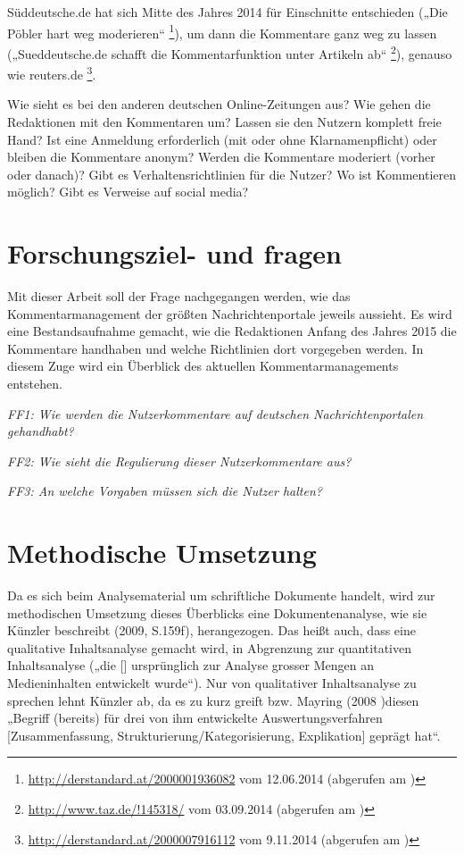 \documentclass[12pt]{article} %
\begin{document}
Süddeutsche.de hat sich Mitte des Jahres 2014 für Einschnitte entschieden („Die Pöbler hart weg moderieren“ 
\footnote{\url{http://derstandard.at/2000001936082} vom 12.06.2014 (abgerufen am )}), um dann die Kommentare ganz weg zu lassen („Sueddeutsche.de schafft die Kommentarfunktion unter Artikeln ab“ \footnote{\url{http://www.taz.de/!145318/} vom
03.09.2014 (abgerufen am )}), genauso wie reuters.de \footnote{\url{http://derstandard.at/2000007916112} vom 9.11.2014 (abgerufen am )}.



Wie sieht es bei den anderen deutschen Online-Zeitungen aus? Wie gehen die
Redaktionen mit den Kommentaren um? Lassen sie den Nutzern komplett freie Hand?
Ist eine Anmeldung erforderlich (mit oder ohne Klarnamenpflicht) oder bleiben
die Kommentare anonym? Werden die Kommentare moderiert (vorher oder danach)?
Gibt es Verhaltensrichtlinien für die Nutzer? Wo ist Kommentieren möglich? Gibt
es Verweise auf social media?






\section{Forschungsziel- und fragen}

Mit dieser Arbeit soll der Frage nachgegangen werden, wie das Kommentarmanagement
der größten Nachrichtenportale jeweils aussieht. Es wird eine Bestandsaufnahme
gemacht, wie die Redaktionen Anfang des Jahres 2015 die Kommentare handhaben und
welche Richtlinien dort vorgegeben werden. In diesem Zuge wird ein Überblick des
aktuellen Kommentarmanagements entstehen.

\emph{FF1: Wie werden die Nutzerkommentare auf deutschen Nachrichtenportalen gehandhabt?}

\emph{FF2: Wie sieht die Regulierung dieser Nutzerkommentare aus?}

\emph{FF3: An welche Vorgaben müssen sich die Nutzer halten?}






\section{Methodische Umsetzung}

Da es sich beim Analysematerial um schriftliche Dokumente handelt, wird zur
methodischen Umsetzung dieses Überblicks eine Dokumentenanalyse, wie sie Künzler
beschreibt (2009, S.159f), herangezogen. Das heißt auch, dass eine qualitative
Inhaltsanalyse gemacht wird, in Abgrenzung zur quantitativen Inhaltsanalyse
(„die [\ellipsis] ursprünglich zur Analyse grosser Mengen an Medieninhalten entwickelt
wurde“). Nur von qualitativer Inhaltsanalyse zu sprechen lehnt Künzler ab, da es
zu kurz greift bzw. Mayring (2008 )diesen „Begriff (bereits) für drei von ihm
entwickelte Auswertungsverfahren [Zusammenfassung,
Strukturierung/Kategorisierung, Explikation] geprägt hat“.   
\end{document}
